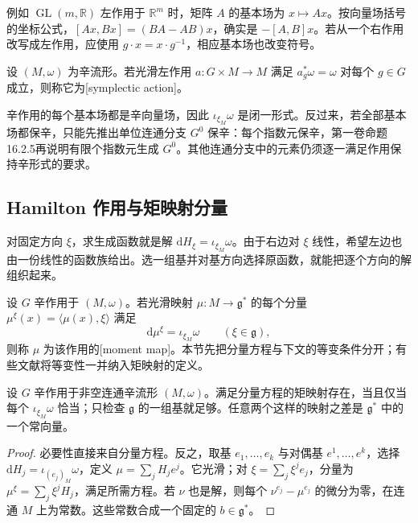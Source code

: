 例如 \(\operatorname{GL}(m,\mathbb R)\) 左作用于 \(\mathbb R^m\) 时，矩阵 \(A\) 的基本场为 \(x\mapsto Ax\)。按向量场括号的坐标公式，\([Ax,Bx]=(BA-AB)x\)，确实是 \(-[A,B]x\)。若从一个右作用改写成左作用，应使用 \(g\cdot x=x\cdot g^{-1}\)，相应基本场也改变符号。

\begin{definition}\label{g4:def:1001:symplectic-action}
	设 \((M,\omega)\) 为辛流形。若光滑左作用 \(a:G\times M\to M\) 满足 \(a_g^*\omega=\omega\) 对每个 \(g\in G\) 成立，则称它为[symplectic action]。
\end{definition}

辛作用的每个基本场都是辛向量场，因此 \(\iota_{\xi_M}\omega\) 是闭一形式。反过来，若全部基本场都保辛，只能先推出单位连通分支 \(G^0\) 保辛：每个指数元保辛，第一卷命题16.2.5再说明有限个指数元生成 \(G^0\)。其他连通分支中的元素仍须逐一满足作用保持辛形式的要求。

\subsection{Hamilton 作用与矩映射分量}
\label{g4:subsec:1001:02}

对固定方向 \(\xi\)，求生成函数就是解 \(\mathrm{d}H_\xi=\iota_{\xi_M}\omega\)。由于右边对 \(\xi\) 线性，希望左边也由一份线性的函数族给出。选一组基并对基方向选择原函数，就能把逐个方向的解组织起来。

\begin{definition}\label{g4:def:1001:moment-map}
	设 \(G\) 辛作用于 \((M,\omega)\)。若光滑映射 \(\mu:M\to\mathfrak g^*\) 的每个分量 \(\mu^\xi(x)=\langle\mu(x),\xi\rangle\) 满足
	\begin{equation}\label{g4:eq:1001:moment-equation}
		\mathrm{d}\mu^\xi=\iota_{\xi_M}\omega
		\qquad(\xi\in\mathfrak g),
	\end{equation}
	则称 \(\mu\) 为该作用的[moment map]。本节先把分量方程与下文的等变条件分开；有些文献将等变性一并纳入矩映射的定义。
\end{definition}

\begin{proposition}\label{g4:prop:1001:component-existence}
	设 \(G\) 辛作用于非空连通辛流形 \((M,\omega)\)。满足分量方程的矩映射存在，当且仅当每个 \(\iota_{\xi_M}\omega\) 恰当；只检查 \(\mathfrak g\) 的一组基就足够。任意两个这样的映射之差是 \(\mathfrak g^*\) 中的一个常向量。
\end{proposition}
\begin{proof}
	必要性直接来自分量方程。反之，取基 \(e_1,\ldots,e_k\) 与对偶基 \(e^1,\ldots,e^k\)，选择 \(\mathrm{d}H_j=\iota_{(e_j)_M}\omega\)，定义 \(\mu=\sum_jH_je^j\)。它光滑；对 \(\xi=\sum_j\xi^je_j\)，分量为 \(\mu^\xi=\sum_j\xi^jH_j\)，满足所需方程。若 \(\nu\) 也是解，则每个 \(\nu^{e_j}-\mu^{e_j}\) 的微分为零，在连通 \(M\) 上为常数。这些常数合成一个固定的 \(b\in\mathfrak g^*\)。
\end{proof}

